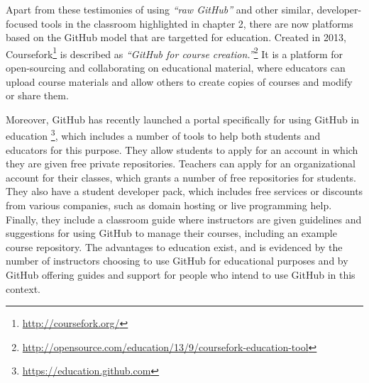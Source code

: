 Apart from these testimonies of using \textit{``raw GitHub''} and other similar, developer-focused tools in the classroom highlighted in chapter 2, there are now platforms based on the GitHub model that are targetted for education. Created in 2013, Coursefork\footnote{\url{http://coursefork.org/}} is described as \textit{``GitHub for course creation.''}\footnote{\url{http://opensource.com/education/13/9/coursefork-education-tool}} It is a platform for open-sourcing and collaborating on educational material, where educators can upload course materials and allow others to create copies of courses and modify or share them.

Moreover, GitHub has recently launched a portal specifically for using GitHub in education \footnote{\url{https://education.github.com}}, which includes a number of tools to help both students and educators for this purpose. They allow students to apply for an account in which they are given free private repositories. Teachers can apply for an organizational account for their classes, which grants a number of free repositories for students. They also have a student developer pack, which includes free services or discounts from various companies, such as domain hosting or live programming help. Finally, they include a classroom guide where instructors are given guidelines and suggestions for using GitHub to manage their courses, including an example course repository. The advantages to education exist, and is evidenced by the number of instructors choosing to use GitHub for educational purposes and by GitHub offering guides and support for people who intend to use GitHub in this context.
